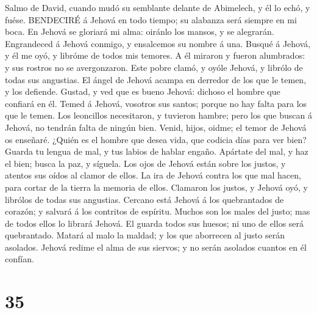  Salmo de David, cuando mudó su semblante delante de
Abimelech, y él lo echó, y fuése. BENDECIRÉ á Jehová en todo tiempo; su
alabanza será siempre en mi boca.  En Jehová se gloriará mi
alma: oiránlo los mansos, y se alegrarán.  Engrandeced á
Jehová conmigo, y ensalcemos su nombre á una.  Busqué á
Jehová, y él me oyó, y libróme de todos mis temores.  A él
miraron y fueron alumbrados: y sus rostros no se avergonzaron.
 Este pobre clamó, y oyóle Jehová, y librólo de todas sus
angustias.  El ángel de Jehová acampa en derredor de los que
le temen, y los defiende.  Gustad, y ved que es bueno
Jehová: dichoso el hombre que confiará en él.  Temed á
Jehová, vosotros sus santos; porque no hay falta para los que le temen.
 Los leoncillos necesitaron, y tuvieron hambre; pero los
que buscan á Jehová, no tendrán falta de ningún bien. 
Venid, hijos, oidme; el temor de Jehová os enseñaré. 
¿Quién es el hombre que desea vida, que codicia días para ver bien?
 Guarda tu lengua de mal, y tus labios de hablar engaño.
 Apártate del mal, y haz el bien; busca la paz, y síguela.
 Los ojos de Jehová están sobre los justos, y atentos sus
oídos al clamor de ellos.  La ira de Jehová contra los que
mal hacen, para cortar de la tierra la memoria de ellos. 
Clamaron los justos, y Jehová oyó, y librólos de todas sus angustias.
 Cercano está Jehová á los quebrantados de corazón; y
salvará á los contritos de espíritu.  Muchos son los males
del justo; mas de todos ellos lo librará Jehová.  El guarda
todos sus huesos; ni uno de ellos será quebrantado.  Matará
al malo la maldad; y los que aborrecen al justo serán asolados.
 Jehová redime el alma de sus siervos; y no serán asolados
cuantos en él confían.

\hypertarget{section-34}{%
\section{35}\label{section-34}}

